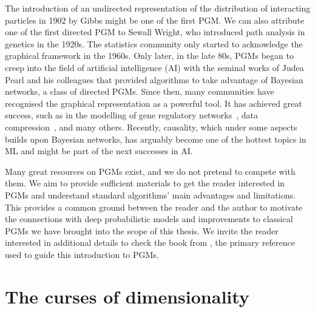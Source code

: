 The introduction of an undirected representation of the distribution of interacting particles in 1902 by Gibbs might be one of the first PGM. We can also attribute one of the first directed PGM to Sewall Wright, who introduced path analysis in genetics in the 1920s. The statistics community only started to acknowledge the graphical framework in the 1960s. Only later, in the late 80s, PGMs began to creep into the field of artificial intelligence (AI) with the seminal works of Judea Pearl and his colleagues that provided algorithms to take advantage of Bayesian networks, a class of directed PGMs. Since then, many communities have recognised the graphical representation as a powerful tool. It has achieved great success, such as in the modelling of gene regulatory networks~\citep{werhli2007reconstructing}, data compression~\citep{mceliece1998turbo}, and many others. Recently, causality, which under some aspects builds upon Bayesian networks, has arguably become one of the hottest topics in ML and might be part of the next successes in AI.

Many great resources on PGMs exist, and we do not pretend to compete with them. We aim to provide sufficient materials to get the reader interested in PGMs and understand standard algorithms' main advantages and limitations. This provides a common ground between the reader and the author to motivate the connections with deep probabilistic models and improvements to classical PGMs we have brought into the scope of this thesis. We invite the reader interested in additional details to check the book from \citet{koller_probabilistic_2009}, the primary reference used to guide this introduction to PGMs.

\section{The curses of dimensionality}
